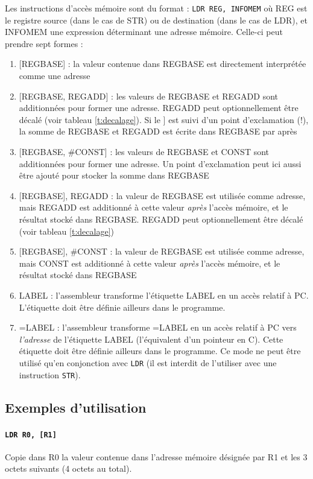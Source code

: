 \documentclass{tufte-handout}
\begin{document}
Les instructions d'accès mémoire sont du format : \texttt{LDR REG, INFOMEM} où REG est le registre source (dans le cas de STR) ou de destination (dans le cas de LDR), et INFOMEM une expression déterminant une adresse mémoire. Celle-ci peut prendre sept formes :
\begin{enumerate}
	\item {[REGBASE] : la valeur contenue dans REGBASE est directement interprétée comme une adresse}
	\item {[REGBASE, REGADD] : les valeurs de REGBASE et REGADD sont additionnées pour former une adresse. REGADD peut optionnellement être décalé (voir tableau \ref{t:decalage}). Si le ] est suivi d'un point d'exclamation (!), la somme de REGBASE et REGADD est écrite dans REGBASE par après}
	\item {[REGBASE, \#CONST] : les valeurs de REGBASE et CONST sont additionnées pour former une adresse. Un point d'exclamation peut ici aussi être ajouté pour stocker la somme dans REGBASE}
	\item {[REGBASE], REGADD : la valeur de REGBASE est utilisée comme adresse, mais REGADD est additionné à cette valeur \textit{après} l'accès mémoire, et le résultat stocké dans REGBASE. REGADD peut optionnellement être décalé (voir tableau \ref{t:decalage})}
	\item {[REGBASE], \#CONST : la valeur de REGBASE est utilisée comme adresse, mais CONST est additionné à cette valeur \textit{après} l'accès mémoire, et le résultat stocké dans REGBASE}
	\item LABEL : l'assembleur transforme l'étiquette LABEL en un accès relatif à PC. L'étiquette doit être définie ailleurs dans le programme.
	\item =LABEL : l'assembleur transforme =LABEL en un accès relatif à PC vers \textit{l'adresse} de l'étiquette LABEL (l'équivalent d'un pointeur en C). Cette étiquette doit être définie ailleurs dans le programme. Ce mode ne peut être utilisé qu'en conjonction avec \texttt{LDR} (il est interdit de l'utiliser avec une instruction \texttt{STR}).
\end{enumerate}

\subsection{Exemples d'utilisation}

\paragraph{\texttt{LDR R0, [R1]}} Copie dans R0 la valeur contenue dans l'adresse mémoire désignée par R1 et les 3 octets suivants (4 octets au total).
\end{document}
